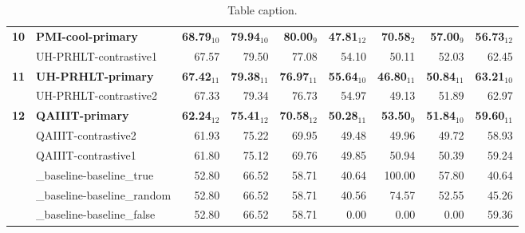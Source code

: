 \begin{table*}[tbh]
\begin{center}
\begin{tabular}{clrrrrrrr}
\bf 10 & \bf PMI-cool-primary & \bf 68.79$_{10}$ & \bf \scriptsize 79.94$_{10}$ & \bf \scriptsize 80.00$_{9}$ & \bf \scriptsize 47.81$_{12}$ & \bf \scriptsize 70.58$_{2}$ & \bf \scriptsize 57.00$_{9}$ & \bf \scriptsize 56.73$_{12}$ \\
& UH-PRHLT-contrastive1 & 67.57 & \scriptsize 79.50 & \scriptsize 77.08 & \scriptsize 54.10 & \scriptsize 50.11 & \scriptsize 52.03 & \scriptsize 62.45 \\
\bf 11 & \bf UH-PRHLT-primary & \bf 67.42$_{11}$ & \bf \scriptsize 79.38$_{11}$ & \bf \scriptsize 76.97$_{11}$ & \bf \scriptsize 55.64$_{10}$ & \bf \scriptsize 46.80$_{11}$ & \bf \scriptsize 50.84$_{11}$ & \bf \scriptsize 63.21$_{10}$ \\
& UH-PRHLT-contrastive2 & 67.33 & \scriptsize 79.34 & \scriptsize 76.73 & \scriptsize 54.97 & \scriptsize 49.13 & \scriptsize 51.89 & \scriptsize 62.97 \\
\bf 12 & \bf QAIIIT-primary & \bf 62.24$_{12}$ & \bf \scriptsize 75.41$_{12}$ & \bf \scriptsize 70.58$_{12}$ & \bf \scriptsize 50.28$_{11}$ & \bf \scriptsize 53.50$_{9}$ & \bf \scriptsize 51.84$_{10}$ & \bf \scriptsize 59.60$_{11}$ \\
& QAIIIT-contrastive2 & 61.93 & \scriptsize 75.22 & \scriptsize 69.95 & \scriptsize 49.48 & \scriptsize 49.96 & \scriptsize 49.72 & \scriptsize 58.93 \\
& QAIIIT-contrastive1 & 61.80 & \scriptsize 75.12 & \scriptsize 69.76 & \scriptsize 49.85 & \scriptsize 50.94 & \scriptsize 50.39 & \scriptsize 59.24 \\
& \_baseline-baseline\_true & 52.80 & \scriptsize 66.52 & \scriptsize 58.71 & \scriptsize 40.64 & \scriptsize 100.00 & \scriptsize 57.80 & \scriptsize 40.64 \\
& \_baseline-baseline\_random & 52.80 & \scriptsize 66.52 & \scriptsize 58.71 & \scriptsize 40.56 & \scriptsize 74.57 & \scriptsize 52.55 & \scriptsize 45.26 \\
& \_baseline-baseline\_false & 52.80 & \scriptsize 66.52 & \scriptsize 58.71 & \scriptsize  0.00 & \scriptsize  0.00 & \scriptsize  0.00 & \scriptsize 59.36 \\
\end{tabular}
\caption{Table caption.}
\label{table:results}
\end{center}
\end{table*}
